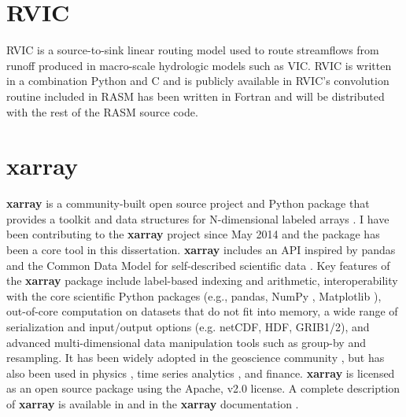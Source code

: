 
\section{RVIC}
\label{sec:rvic_dev}

RVIC is a source-to-sink linear routing model used to route streamflows from runoff produced in macro-scale hydrologic models such as VIC.
RVIC is written in a combination Python and C and is publicly available in \citet{Hamman_2015}
RVIC's convolution routine included in RASM has been written in Fortran and will be distributed with the rest of the RASM source code.

\section{xarray}
\label{sec:xarray_dev}

\textbf{xarray} is a community-built open source project and Python package that provides a toolkit and data structures for N-dimensional labeled arrays \citep{Hoyer_2016}.
I have been contributing to the \textbf{xarray} project since May 2014 and the package has been a core tool in this dissertation.
\textbf{xarray} includes an API inspired by pandas \citep{mckinney_2010} and the Common Data Model for self-described scientific data \citep{Rew_1990,Brown_1993}.
Key features of the \textbf{xarray} package include label-based indexing and arithmetic, interoperability with the core scientific Python packages (e.g., pandas, NumPy \citep{Jones_2001}, Matplotlib \citep{van_der_Walt_2011}), out-of-core computation on datasets that do not fit into memory, a wide range of serialization and input/output options (e.g. netCDF, HDF, GRIB1/2), and advanced multi-dimensional data manipulation tools such as group-by and resampling.
It has been widely adopted in the geoscience community \citep[e.g.][]{xgcm,Dawson_2016a,Dawson_2016b}, but has also been used in physics \citep[e.g.][]{pycalphad}, time series analytics \citep{cesium}, and finance.
\textbf{xarray} is licensed as an open
source package using the Apache, v2.0 license.
A complete description of \textbf{xarray} is available in \citet{Hoyer_2016} and in the \textbf{xarray} documentation \citep{xarray_docs}.
